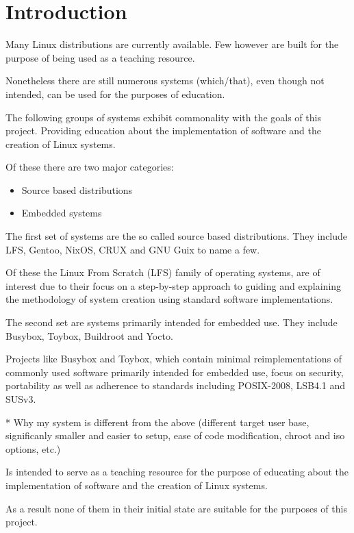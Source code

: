 \section{Introduction}\label{Introduction}

Many Linux distributions are currently available. Few however are built for the purpose of being used as a teaching resource.

Nonetheless there are still numerous systems (which/that), even though not intended, can be used for the purposes of education.

The following groups of systems exhibit commonality with the goals of this project. Providing education about the implementation of software and the creation of Linux systems.

Of these there are two major categories:

\begin{itemize}
    \item Source based distributions
    \item Embedded systems
\end{itemize}

The first set of systems  are the so called source based distributions. They include LFS, Gentoo, NixOS, CRUX and GNU Guix to name a few.  

Of these the Linux From Scratch (LFS) family of operating systems, are of interest due to their focus on a step-by-step approach to guiding and explaining the methodology of system creation using standard software implementations. 

The second set are systems primarily intended for embedded use. They include Busybox, Toybox, Buildroot and Yocto.

Projects like Busybox and Toybox, which contain minimal reimplementations of commonly used software primarily intended for embedded use, focus on security, portability as well as adherence to standards including POSIX-2008, LSB4.1 and SUSv3.

* Why my system is different from the above (different target user base, significanly smaller and easier to setup, ease of code modification, chroot and iso options, etc.)

Is intended to serve as a teaching resource for the purpose of educating about the implementation of software and the creation of Linux systems.

As a result none of them in their initial state are suitable for the purposes of this project.

